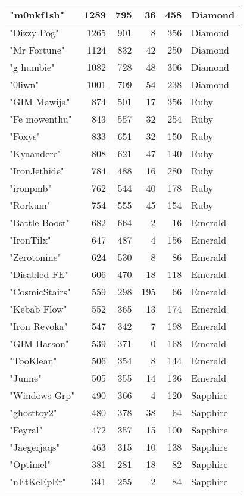 \documentclass{article}
\begin{document}
\begin{table}[htbp]
\begin{tabular}{|l|r|r|r|r|l|}
"m0nkf1sh" & 1289 & 795 & 36 & 458 & Diamond \\ \hline
"Dizzy Pog" & 1265 & 901 & 8 & 356 & Diamond \\ \hline
"Mr Fortune" & 1124 & 832 & 42 & 250 & Diamond \\ \hline
"g humbie" & 1082 & 728 & 48 & 306 & Diamond \\ \hline
"0liwn" & 1001 & 709 & 54 & 238 & Diamond \\ \hline
"GIM Mawija" & 874 & 501 & 17 & 356 & Ruby \\ \hline
"Fe mowenthu" & 843 & 557 & 32 & 254 & Ruby \\ \hline
"Foxys" & 833 & 651 & 32 & 150 & Ruby \\ \hline
"Kyaandere" & 808 & 621 & 47 & 140 & Ruby \\ \hline
"IronJethide" & 784 & 488 & 16 & 280 & Ruby \\ \hline
"ironpmb" & 762 & 544 & 40 & 178 & Ruby \\ \hline
"Rorkum" & 754 & 555 & 45 & 154 & Ruby \\ \hline
"Battle Boost" & 682 & 664 & 2 & 16 & Emerald \\ \hline
"IronTilx" & 647 & 487 & 4 & 156 & Emerald \\ \hline
"Zerotonine" & 624 & 530 & 8 & 86 & Emerald \\ \hline
"Disabled FE" & 606 & 470 & 18 & 118 & Emerald \\ \hline
"CosmicStairs" & 559 & 298 & 195 & 66 & Emerald \\ \hline
"Kebab Flow" & 552 & 365 & 13 & 174 & Emerald \\ \hline
"Iron Revoka" & 547 & 342 & 7 & 198 & Emerald \\ \hline
"GIM Hasson" & 539 & 371 & 0 & 168 & Emerald \\ \hline
"TooKlean" & 506 & 354 & 8 & 144 & Emerald \\ \hline
"Junne" & 505 & 355 & 14 & 136 & Emerald \\ \hline
"Windows Grp" & 490 & 366 & 4 & 120 & Sapphire \\ \hline
"ghosttoy2" & 480 & 378 & 38 & 64 & Sapphire \\ \hline
"Feyral" & 472 & 357 & 15 & 100 & Sapphire \\ \hline
"Jaegerjaqs" & 463 & 315 & 10 & 138 & Sapphire \\ \hline
"Optimel" & 381 & 281 & 18 & 82 & Sapphire \\ \hline
"nEtKeEpEr" & 341 & 255 & 2 & 84 & Sapphire \\ \hline

\end{tabular}
\end{table}
\end{document}
